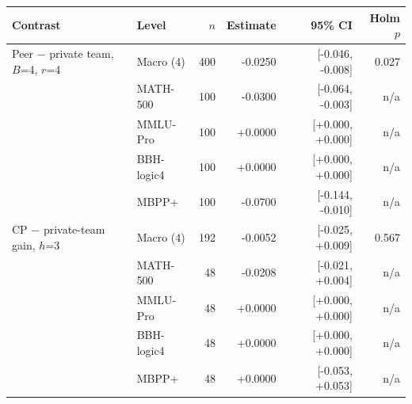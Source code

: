 \begin{tabular}{llrrrr}
\toprule
Contrast & Level & $n$ & Estimate & 95\% CI & Holm $p$ \\
\midrule
Peer $-$ private team, $B$=4, $r$=4 & Macro (4) & 400 & -0.0250 & [-0.046, -0.008] & 0.027 \\
\quad & MATH-500 & 100 & -0.0300 & [-0.064, -0.003] & n/a \\
\quad & MMLU-Pro & 100 & +0.0000 & [+0.000, +0.000] & n/a \\
\quad & BBH-logic4 & 100 & +0.0000 & [+0.000, +0.000] & n/a \\
\quad & MBPP+ & 100 & -0.0700 & [-0.144, -0.010] & n/a \\
\midrule
CP $-$ private-team gain, $h$=3 & Macro (4) & 192 & -0.0052 & [-0.025, +0.009] & 0.567 \\
\quad & MATH-500 & 48 & -0.0208 & [-0.021, +0.004] & n/a \\
\quad & MMLU-Pro & 48 & +0.0000 & [+0.000, +0.000] & n/a \\
\quad & BBH-logic4 & 48 & +0.0000 & [+0.000, +0.000] & n/a \\
\quad & MBPP+ & 48 & +0.0000 & [-0.053, +0.053] & n/a \\
\bottomrule
\end{tabular}
